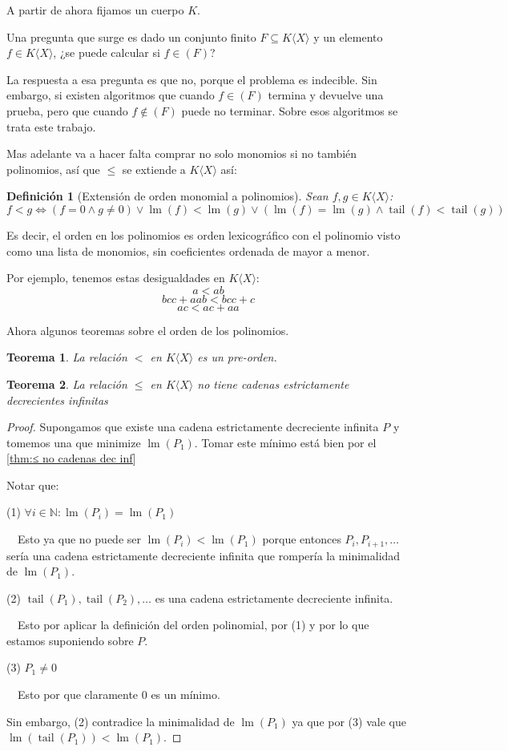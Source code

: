 \documentclass{amsbook} %
\theoremstyle{customstyle}
\newtheorem{definition}{Definición}[section]
\newtheorem{theorem}{Teorema}[section]
\DeclareMathOperator{\lm}{lm}
\DeclareMathOperator{\tail}{tail}
\begin{document}
A partir de ahora fijamos un cuerpo $K$.

Una pregunta que surge es dado un conjunto finito $F ⊆ K⟨X⟩$ y un elemento $f ∈ K⟨X⟩$, ¿se puede calcular si $f ∈ (F)$?

La respuesta a esa pregunta es que no, porque el problema es indecible. Sin embargo, si existen algoritmos que cuando $f ∈ (F)$ termina y devuelve una prueba, pero que cuando $f ∉ (F)$ puede no terminar. Sobre esos algoritmos se trata este trabajo.

Mas adelante va a hacer falta comprar no solo monomios si no también polinomios, así que $≤$ se extiende a $K⟨X⟩$ así:

\begin{definition}[Extensión de orden monomial a polinomios]
Sean $f, g ∈  K⟨X⟩$:
\[ f < g ⇔ (f = 0 ∧ g ≠ 0) ∨ \lm(f) < \lm(g) ∨ (\lm(f) = \lm(g) ∧ \tail(f) < \tail(g)) \]
\end{definition}

Es decir, el orden en los polinomios es orden lexicográfico con el polinomio visto como una lista de monomios, sin coeficientes ordenada de mayor a menor.

Por ejemplo, tenemos estas desigualdades en $K⟨X⟩$:
\[ a < ab \]
\[ bcc + aab < bcc + c \]
\[ ac < ac + aa \]

Ahora algunos teoremas sobre el orden de los polinomios.

\begin{theorem} La relación $<$ en $K⟨X⟩$ es un pre-orden.
\end{theorem}

\begin{theorem}\label{thm:≤ en KX no cadenas dec inf}
La relación $≤$ en $K⟨X⟩$ no tiene cadenas estrictamente decrecientes infinitas
\end{theorem}
\begin{proof}
Supongamos que existe una cadena estrictamente decreciente infinita $P$ y tomemos una que minimize $\lm(P_1)$. Tomar este mínimo está bien por el \cref{thm:≤ no cadenas dec inf}

Notar que:

(1) $∀i ∈ ℕ : \lm(P_i) = \lm(P_1)$

  Esto ya que no puede ser $\lm(P_i) < \lm(P_1)$ porque entonces $P_i, P_{i + 1}, …$ sería una cadena estrictamente decreciente infinita que rompería la minimalidad de $\lm(P_1)$.


(2) $\tail(P_1), \tail(P_2), …$ es una cadena estrictamente decreciente infinita.

  Esto por aplicar la definición del orden polinomial, por (1) y por lo que estamos suponiendo sobre $P$.

(3) $P_1 ≠ 0$

  Esto por que claramente $0$ es un mínimo.

Sin embargo, (2) contradice la minimalidad de $\lm(P_1)$ ya que por (3) vale que $\lm(\tail(P_1)) < \lm(P_1)$.

\end{proof}
\end{document}
